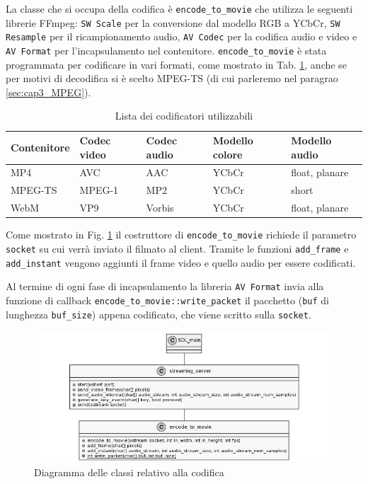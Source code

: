 La classe che si occupa della codifica è \verb|encode_to_movie| che utilizza le seguenti librerie FFmpeg: \verb|SW Scale| per la conversione dal modello RGB a YCbCr, \verb|SW Resample| per il ricampionamento audio, \verb|AV Codec| per la codifica audio e video e \verb|AV Format| per l'incapsulamento nel contenitore. \verb|encode_to_movie| è stata programmata per codificare in vari formati, come mostrato in Tab. \ref{table:PossibiliCodifiche}, anche se per motivi di decodifica si è scelto MPEG-TS (di cui parleremo nel paragrao \ref{sec:cap3_MPEG}).

\begin{table}[H]
	\centering
	\begin{tabular}{||l l l l l||} 
		\hline
		Contenitore & Codec video & Codec audio & Modello colore & Modello audio \\
		\hline\hline
		MP4 & AVC & AAC & YCbCr & float, planare \\
		\hline
		MPEG-TS & MPEG-1 & MP2 & YCbCr & short \\
		\hline
		WebM & VP9 & Vorbis & YCbCr & float, planare \\
		\hline
	\end{tabular}

	\caption{Lista dei codificatori utilizzabili}
	\label{table:PossibiliCodifiche}
\end{table}

Come mostrato in Fig. \ref{fig:class_server_and_encoding} il costruttore di \verb|encode_to_movie| richiede il parametro \verb|socket| su cui verrà inviato il filmato al client. Tramite le funzioni \verb|add_frame| e \verb|add_instant| vengono aggiunti il frame video e quello audio per essere codificati.

Al termine di ogni fase di incapsulamento la libreria \verb|AV Format| invia alla funzione di callback \verb|encode_to_movie::write_packet| il pacchetto (\verb|buf| di lunghezza \verb|buf_size|) appena codificato, che viene scritto sulla \verb|socket|. 

\begin{figure}[H]
	\includegraphics[width=\linewidth]{immagini/class_server_and_encoding}
	\caption{Diagramma delle classi relativo alla codifica}
	\label{fig:class_server_and_encoding}
\end{figure}



